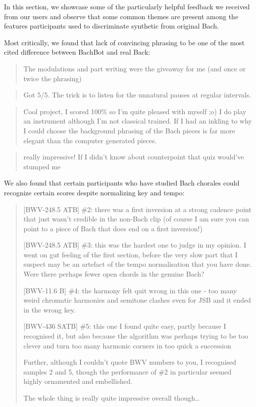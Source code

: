 In this section, we showcase some of the particularly helpful feedback we
received from our users and observe that some common themes are present
among the features participants used to discriminate synthetic from original Bach.

Most critically, we found that lack of convincing phrasing to be one of the most
cited difference between BachBot and real Back:

\begin{quote}
  The modulations and part writing were the giveaway for me (and once or twice the phrasing)
\end{quote}

\begin{quote}
  Got 5/5. The trick is to listen for the unnatural pauses at regular intervals.
\end{quote}

\begin{quote}
  Cool project, I scored 100\% so I'm quite pleased with myself ;o) I do
  play an instrument although I'm not classical trained. If I had an
  inkling to why I could choose the background phrasing of the Bach
  pieces is far more elegant than the computer generated pieces.
\end{quote}


\begin{quote}
  really impressive! If I didn't know about counterpoint that quiz would've stumped me
\end{quote}

We also found that certain participants who have studied Bach chorales could recognize
certain scores despite normalizing key and tempo:
\begin{quote}
  [BWV-248.5 ATB]
  \#2: there was a first inversion at a strong cadence point that just wasn't
  credible in the non-Bach clip (of course I am sure you can point to a piece
  of Bach that does end on a first inversion!)

  [BWV-248.5 ATB]
  \#3: this was the hardest one to judge in my opinion. I went on gut feeling
  of the first section, before the very slow part that I suspect may be an
  artefact of the tempo normalisation that you have done. Were there perhaps
  fewer open chords in the genuine Bach?

  [BWV-11.6 B]
  \#4: the harmony felt quit wrong in this one - too many weird chromatic
  harmonies and semitone clashes even for JSB and it ended in the wrong key.

  [BWV-436 SATB]
  \#5: this one I found quite easy, partly because I recognised it, but also
  because the algorithm was perhaps trying to be too clever and turn too many
  harmonic corners in too quick a succession

  Further, although I couldn't quote BWV numbers to you, I recognised samples 2
  and 5, though the performance of \#2 in particular seemed highly ornamented
  and embellished.

  The whole thing is really quite impressive overall though\ldots
\end{quote}

